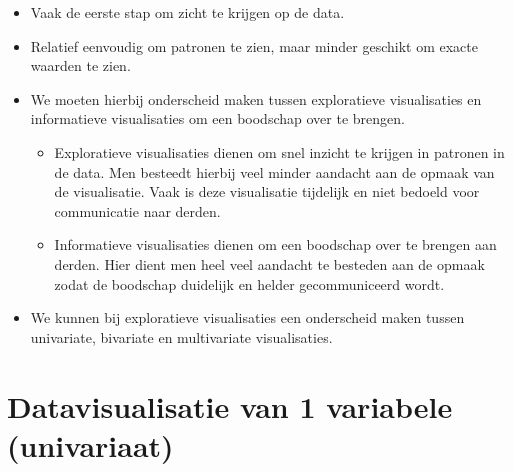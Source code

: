 \documentclass[]{memoir}
\providecommand{\tightlist}{%
  \setlength{\itemsep}{0pt}\setlength{\parskip}{0pt}}
\begin{document}
\begin{itemize}
\tightlist
\item
  Vaak de eerste stap om zicht te krijgen op de data.
\item
  Relatief eenvoudig om patronen te zien, maar minder geschikt om exacte waarden te zien.
\item
  We moeten hierbij onderscheid maken tussen exploratieve visualisaties en informatieve visualisaties om een boodschap over te brengen.

  \begin{itemize}
  \tightlist
  \item
    Exploratieve visualisaties dienen om snel inzicht te krijgen in patronen in de data. Men besteedt hierbij veel minder aandacht aan de opmaak van de visualisatie. Vaak is deze visualisatie tijdelijk en niet bedoeld voor communicatie naar derden.
  \item
    Informatieve visualisaties dienen om een boodschap over te brengen aan derden. Hier dient men heel veel aandacht te besteden aan de opmaak zodat de boodschap duidelijk en helder gecommuniceerd wordt.
  \end{itemize}
\item
  We kunnen bij exploratieve visualisaties een onderscheid maken tussen univariate, bivariate en multivariate visualisaties.
\end{itemize}

\hypertarget{datavisualisatie-van-1-variabele-univariaat}{%
\section{Datavisualisatie van 1 variabele (univariaat)}\label{datavisualisatie-van-1-variabele-univariaat}}
\end{document}
